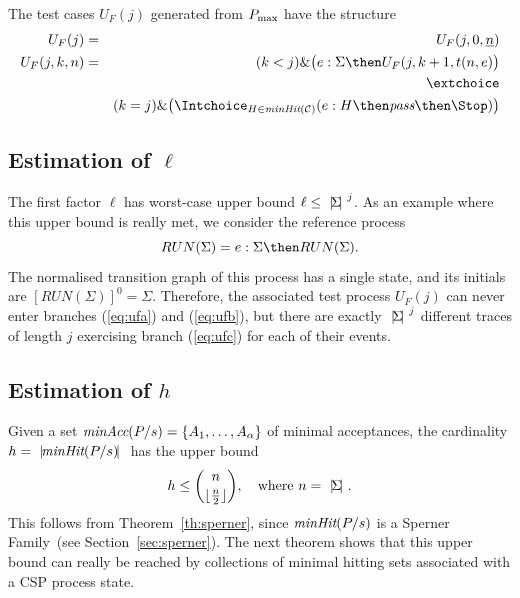 The test cases $U_F(j)$ generated from $P_\text{max}$ have the structure
\begin{eqnarray*}
\label{eq:UFP}
U_F(j) & = & U_F(j,0,\ii n)
\\
U_F(j,k,n) & = &   (k < j) \& \big(e:\Sigma   \then U_F(j,k+1,t(n,e) \big)
\\ & & \extchoice  
\\ & & (k = j) \& \big( \Intchoice_{H\in\minhits({\cal C})} (e:H   \then \epass \then\Stop   )  \big)
\end{eqnarray*}

\subsection{Estimation of $\ell$}
The first factor $\ell$ has worst-case upper bound $\ell\le {~|\! \Sigma\!|~}^j$.
As an example where this upper bound is really met, we consider the reference
process
\[
RUN(\Sigma) = e:\Sigma \then RUN(\Sigma).
\]
The normalised transition graph of this process has a single state, and its initials
are $[RUN(\Sigma)]^0 = \Sigma$. Therefore, the associated test process $U_F(j)$ can
never enter branches (\ref{eq:ufa}) and (\ref{eq:ufb}), but there are exactly
${~|\! \Sigma\!|~}^j$ different traces of length $j$ exercising branch (\ref{eq:ufc})
for each of their events.

\subsection{Estimation of $h$}
Given a set $\text{\it minAcc}(P/s) = \{ A_1,\dots, A_\alpha \}$ of   minimal
acceptances, the cardinality   $h = {~|\! \text{\it minHit}(P/s)\!|~}$ has the upper bound
\[
h \le \binom{n}{\lfloor\frac{n}{2}\rfloor}, \quad \text{where $n = {~|\! \Sigma\!|~}$.}
\]
This follows from Theorem~\ref{th:sperner}, since $\text{\it minHit}(P/s)$ is a
Sperner Family~(see Section~\ref{sec:sperner}). The next theorem shows that
this upper bound can really be reached by collections of minimal hitting sets
associated with a CSP process state.

